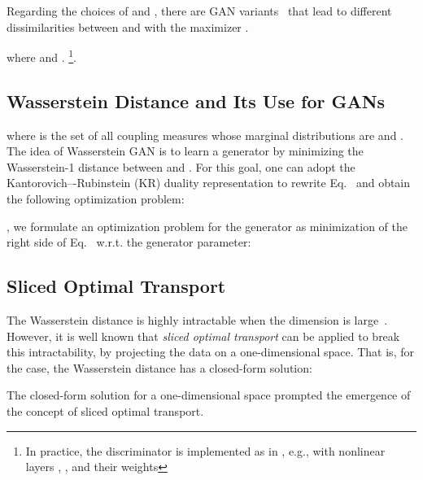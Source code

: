 Regarding the choices of  and , there are GAN variants~\citep{goodfellow2014generative,sebastian2016f,arjovsky2017wasserstein} that lead to different dissimilarities between  and  with the maximizer .

where  and .
\footnote{In practice, the discriminator  is implemented as in , e.g.,  with nonlinear layers , , and their weights }. 


\subsection{Wasserstein Distance and Its Use for GANs}
\label{ssec:wasserstein_distance_gan}


where    is the set of all coupling measures whose marginal distributions are  and .
The idea of Wasserstein GAN is to learn a generator by minimizing the Wasserstein-1 distance between  and . 
For this goal, one can adopt
the Kantorovich–-Rubinstein (KR) duality representation to rewrite Eq.~ and obtain the following optimization problem:

, we formulate an optimization problem for the generator as minimization of the right side of Eq.~ w.r.t. the generator parameter:



\subsection{Sliced Optimal Transport}
\label{ssec:sliced_optimal_transport}


The Wasserstein distance is highly intractable when the dimension  is large~\citep{arjovsky2017wasserstein}. 
However, it is well known that \textit{sliced optimal transport} can be applied to break this intractability, by projecting the data on a one-dimensional space.
That is, for the  case, the Wasserstein distance has a closed-form solution:

The closed-form solution for a one-dimensional space prompted the emergence of the concept of sliced optimal transport.

